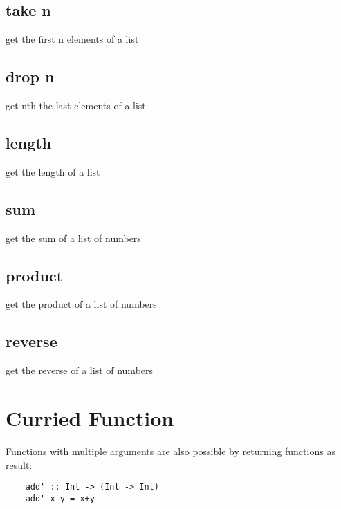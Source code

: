 \documentclass[a4paper,12pt]{article}
\theoremstyle{definition}
\begin{document}
\subsection*{take n} get the first n elements of a list 

\subsection*{drop n} get nth the last elements of a list 

\subsection*{length} get the length of a list 

\subsection*{sum} get the sum of a list of numbers

\subsection*{product} get the product of a list of numbers

\subsection*{reverse} get the reverse of a list of numbers

\section{Curried Function} Functions with multiple arguments are also possible by returning functions as result:
  \begin{lstlisting}
    add' :: Int -> (Int -> Int)
    add' x y = x+y
  \end{lstlisting}
\end{document}
